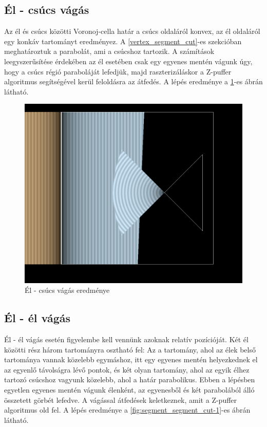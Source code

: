 \subsection{Él - csúcs vágás}
Az él és csúcs közötti Voronoj-cella határ a csúcs oldaláról konvex, az él oldaláról egy konkáv tartományt eredményez. A \ref{vertex_segment_cut}-es szekcióban meghatároztuk a parabolát, ami a csúcshoz tartozik. A számítások leegyszerűsítése érdekében az él esetében csak egy egyenes mentén vágunk úgy, hogy a csúcs régió paraboláját lefedjük, majd raszterizáláskor a Z-puffer algoritmus segítségével kerül feloldásra az átfedés. A lépés eredménye a \ref{fig:segment_vertex_cut-1}-es ábrán látható.

\begin{figure}[H]
	\centering
	\includegraphics[width=.55\linewidth]{images/segment_vertex_cut.png}
	\caption{Él - csúcs vágás eredménye}
	\label{fig:segment_vertex_cut-1}
\end{figure}

\subsection{Él - él vágás}
Él - él vágás esetén figyelembe kell vennünk azoknak relatív pozícióját. Két él közötti rész három tartományra osztható fel: Az a tartomány, ahol az élek belső tartománya vannak közelebb egymáshoz, itt egy egyenes mentén helyezkednek el az egyenlő távolságra lévő pontok, és két olyan tartomány, ahol az egyik élhez tartozó csúcshoz vagyunk közelebb, ahol a határ parabolikus. Ebben a lépésben egyetlen egyenes mentén vágunk élenként, az egyenesből és két parabolából álló összetett görbét lefedve. A vágással átfedések keletkeznek, amit a Z-puffer algoritmus old fel. A lépés eredménye a \ref{fig:segment_segment_cut-1}-es ábrán látható.

